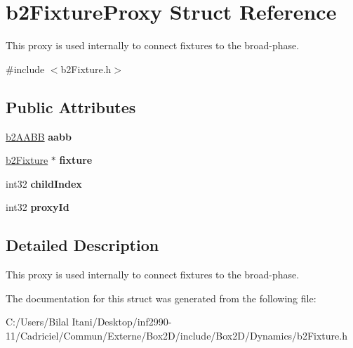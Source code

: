 \hypertarget{structb2_fixture_proxy}{}\section{b2\+Fixture\+Proxy Struct Reference}
\label{structb2_fixture_proxy}


This proxy is used internally to connect fixtures to the broad-\/phase.  




{\ttfamily \#include $<$b2\+Fixture.\+h$>$}

\subsection*{Public Attributes}
\begin{DoxyCompactItemize}
\item 
\hyperlink{structb2_a_a_b_b}{b2\+A\+A\+BB} {\bfseries aabb}\hypertarget{structb2_fixture_proxy_ad8950f61ce28cfa5b676065d4d843da7}{}\label{structb2_fixture_proxy_ad8950f61ce28cfa5b676065d4d843da7}

\item 
\hyperlink{classb2_fixture}{b2\+Fixture} $\ast$ {\bfseries fixture}\hypertarget{structb2_fixture_proxy_a3a0842dc9699c25658548c2005d0ef62}{}\label{structb2_fixture_proxy_a3a0842dc9699c25658548c2005d0ef62}

\item 
int32 {\bfseries child\+Index}\hypertarget{structb2_fixture_proxy_a2edb15552cf71f48dacc3608bb134166}{}\label{structb2_fixture_proxy_a2edb15552cf71f48dacc3608bb134166}

\item 
int32 {\bfseries proxy\+Id}\hypertarget{structb2_fixture_proxy_aa0ca7e71341368fe6c6913fb39c7283b}{}\label{structb2_fixture_proxy_aa0ca7e71341368fe6c6913fb39c7283b}

\end{DoxyCompactItemize}


\subsection{Detailed Description}
This proxy is used internally to connect fixtures to the broad-\/phase. 

The documentation for this struct was generated from the following file\+:\begin{DoxyCompactItemize}
\item 
C\+:/\+Users/\+Bilal Itani/\+Desktop/inf2990-\/11/\+Cadriciel/\+Commun/\+Externe/\+Box2\+D/include/\+Box2\+D/\+Dynamics/b2\+Fixture.\+h\end{DoxyCompactItemize}
